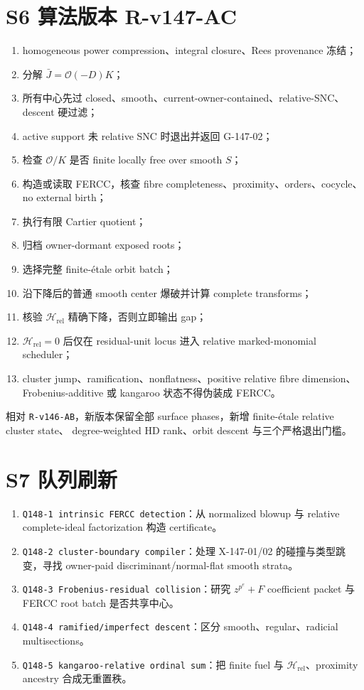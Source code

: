 \documentclass[11pt,a4paper,fontset=fandol]{ctexart}
\newcommand{\Hrel}{\mathscr H_{\mathrm{rel}}}
\newcommand{\cO}{\mathcal O}
\begin{document}
\section{S6 算法版本 R-v147-AC}
\begin{enumerate}
\item homogeneous power compression、integral closure、Rees provenance 冻结；
\item 分解 $\bar J=\cO(-D)K$；
\item 所有中心先过 closed、smooth、current-owner-contained、relative-SNC、descent 硬过滤；
\item active support 未 relative SNC 时退出并返回 G-147-02；
\item 检查 $\cO/K$ 是否 finite locally free over smooth $S$；
\item 构造或读取 FERCC，核查 fibre completeness、proximity、orders、cocycle、no external birth；
\item 执行有限 Cartier quotient；
\item 归档 owner-dormant exposed roots；
\item 选择完整 finite-étale orbit batch；
\item 沿下降后的普通 smooth center 爆破并计算 complete transforms；
\item 核验 $\Hrel$ 精确下降，否则立即输出 gap；
\item $\Hrel=0$ 后仅在 residual-unit locus 进入 relative marked-monomial scheduler；
\item cluster jump、ramification、nonflatness、positive relative fibre dimension、Frobenius-additive 或
kangaroo 状态不得伪装成 FERCC。
\end{enumerate}
相对 \texttt{R-v146-AB}，新版本保留全部 surface phases，新增 finite-étale relative cluster state、
degree-weighted HD rank、orbit descent 与三个严格退出门槛。

\section{S7 队列刷新}
\begin{enumerate}
\item \texttt{Q148-1 intrinsic FERCC detection}：从 normalized blowup 与 relative complete-ideal
factorization 构造 certificate。
\item \texttt{Q148-2 cluster-boundary compiler}：处理 X-147-01/02 的碰撞与类型跳变，寻找
owner-paid discriminant/normal-flat smooth strata。
\item \texttt{Q148-3 Frobenius-residual collision}：研究 $z^{p^e}+F$ coefficient packet 与
FERCC root batch 是否共享中心。
\item \texttt{Q148-4 ramified/imperfect descent}：区分 smooth、regular、radicial multisections。
\item \texttt{Q148-5 kangaroo-relative ordinal sum}：把 finite fuel 与 $\Hrel$、proximity ancestry
合成无重置秩。
\end{enumerate}
\end{document}
